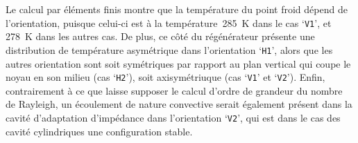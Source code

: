 Le calcul par éléments finis montre que la température du point froid dépend de l'orientation, puisque celui-ci est à la température~\qty{285}{\kelvin} dans le cas `\texttt{V1}', et \qty{278}{\kelvin} dans les autres cas. De plus, ce côté du régénérateur présente une distribution de température asymétrique dans l'orientation `\texttt{H1}', alors que les autres orientation sont soit symétriques par rapport au plan vertical qui coupe le noyau en son milieu (cas `\texttt{H2}'), soit axisymétriuque (cas `\texttt{V1}' et `\texttt{V2}'). Enfin, contrairement à ce que laisse supposer le calcul d'ordre de grandeur du nombre de Rayleigh, un écoulement de nature convective serait également présent dans la cavité d'adaptation d'impédance dans l'orientation `\texttt{V2}', qui est dans le cas des cavité cylindriques une configuration stable.



